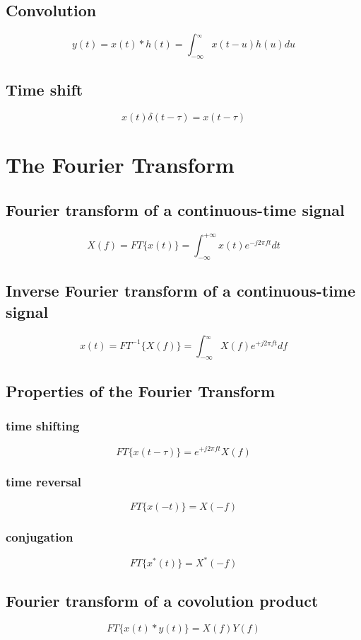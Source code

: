 \documentclass{article}
\begin{document}
\subsection*{Convolution}
$$
y(t)=x(t)*h(t)=\int_{-\infty}^{_\infty}x(t-u)h(u)du
$$

\subsection*{Time shift}
$$
x(t)\delta(t-\tau)=x(t-\tau)
$$
\newpage
\section{The Fourier Transform}
\subsection*{Fourier transform of a continuous-time signal}
$$
X(f)=FT\{x(t)\}=\int_{-\infty}^{+\infty}x(t)e^{-j2\pi ft}dt
$$

\subsection*{Inverse Fourier transform of a continuous-time signal}
$$
x(t)=FT^{-1}\{X(f)\} = \int_{-\infty}^{_\infty}X(f)e^{+j2\pi ft}df
$$

\subsection*{Properties of the Fourier Transform}
\subsubsection*{time shifting}
$$
FT\{x(t-\tau)\}=e^{+j2\pi ft}X(f)
$$
\subsubsection*{time reversal}
$$
FT\{x(-t)\}=X(-f)
$$
\subsubsection*{conjugation}
$$
FT\{x^*(t)\}=X^*(-f)
$$

\subsection*{Fourier transform of a covolution product}
$$
FT\{x(t)*y(t)\}=X(f)Y(f)
$$
\end{document}
